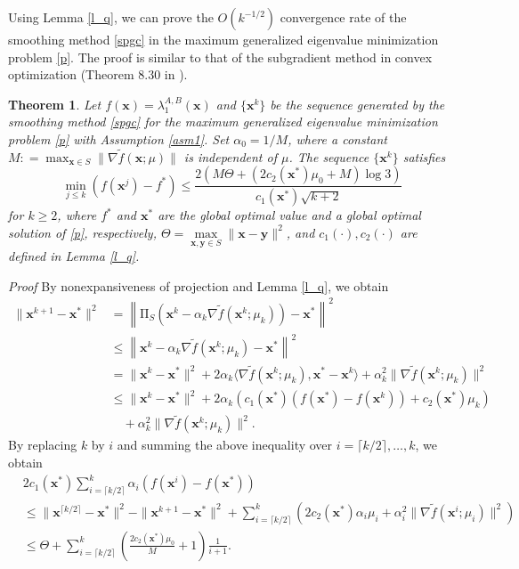 \documentclass[sn-mathphys,Numbered]{sn-jnl}%
\theoremstyle{thmstyleone}%
\newtheorem{theorem}{Theorem}%
\theoremstyle{thmstyletwo}%
\theoremstyle{thmstylethree}%
\newcommand{\e}[1]{\begin{equation}#1\end{equation}}
\newcommand{\prn}[1]{\left(#1\right)}
\def\coloneq{\mathrel{\mathop:}=}
\def\lamx{\lambda^{A,B}_1(\boldsymbol{x})}
\begin{document}
Using Lemma \ref{l_q}, we can prove the $O\left(k^{-1/2}\right)$ convergence rate of the smoothing method \eqref{spgc} in the maximum generalized eigenvalue minimization problem \eqref{p}. The proof is similar to that of the subgradient method in convex optimization (Theorem 8.30 in \cite{beck17}).

\begin{theorem}
Let $f(\bm{x})=\lamx$ and $\{\bm{x}^k\}$ be the sequence generated by the smoothing method \eqref{spgc} for the maximum generalized eigenvalue minimization problem \eqref{p} with Assumption \ref{asm1}. Set $\alpha_{0}=1/M$, where a constant $M\coloneq\max_{\bm{x}\in S}\|\nabla \tilde{f}(\bm{x};\mu)\|$ is independent of $\mu$. The sequence $\{\bm{x}^k\}$ satisfies
\e{
\underset{j\le k}{\min}\left(f(\bm{x}^j)-f^*\right) \le \frac{2(M\Theta+(2c_2(\bm{x}^*)\mu_0+M)\log 3)}{c_1(\bm{x}^*)\sqrt{k+2}}
}
for $k\ge 2$, where $f^*$ and $\bm{x}^*$ are the global optimal value and a global optimal solution of \eqref{p}, respectively, $\Theta=\underset{\bm{x},\bm{y}\in S}{\max}\|\bm{x}-\bm{y}\|^2$, and $c_1(\cdot),c_2(\cdot)$ are defined in Lemma \ref{l_q}.
\label{t_rate}
\end{theorem}
{\it Proof }
By nonexpansiveness of projection and Lemma \ref{l_q}, we obtain
\begin{align}
\|\bm{x}^{k+1}-\bm{x}^*\|^2
& = \left\|\mathrm{\Pi}_S\left(\bm{x}^{k}-\alpha_k\nabla \tilde{f}(\bm{x}^{k};\mu_k)\right)-\bm{x}^*\right\|^2\\
& \le \left\|\bm{x}^{k}-\alpha_k\nabla \tilde{f}(\bm{x}^{k};\mu_k)-\bm{x}^*\right\|^2\\
& = \|\bm{x}^{k}-\bm{x}^*\|^2 + 2\alpha_k\langle\nabla \tilde{f}(\bm{x}^{k};\mu_k),\bm{x}^*-\bm{x}^k\rangle + \alpha_k^2\|\nabla \tilde{f}(\bm{x}^{k};\mu_k)\|^2\\
& \le \|\bm{x}^{k}-\bm{x}^*\|^2 + 2\alpha_k\prn{c_1(\bm{x}^*)(f(\bm{x}^*)-f(\bm{x}^k))+c_2(\bm{x}^*)\mu_k}\\
& \quad + \alpha_k^2\|\nabla \tilde{f}(\bm{x}^{k};\mu_k)\|^2.
\end{align}
By replacing $k$ by $i$ and summing the above inequality over $i=\lceil k/2 \rceil,\ldots,k$, we obtain
\begin{align}
& 2c_1(\bm{x}^*)\sum_{i=\lceil k/2 \rceil}^{k}\alpha_i\left(f(\bm{x}^i)-f(\bm{x}^*)\right)\\
& \le \|\bm{x}^{\lceil k/2 \rceil}-\bm{x}^*\|^2 - \|\bm{x}^{k+1}-\bm{x}^*\|^2 + \sum_{i=\lceil k/2 \rceil}^{k}\left(2c_2(\bm{x}^*)\alpha_i\mu_i + \alpha_i^2\|\nabla \tilde{f}(\bm{x}^{i};\mu_i)\|^2\right)\\
& \le \Theta + \sum_{i=\lceil k/2 \rceil}^{k}\left(\frac{2c_2(\bm{x}^*)\mu_0}{M} + 1\right)\frac{1}{i+1}.
\end{align}
\end{document}
